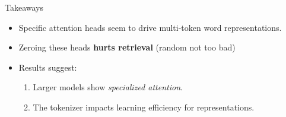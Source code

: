 \documentclass{beamer}
\begin{document}
\begin{frame}{Takeaways}
\begin{itemize}
\item Specific attention heads seem to drive multi-token word representations.
\item Zeroing these heads \textbf{hurts retrieval} (random not too bad)
\item Results suggest:
    \begin{enumerate}
        \item Larger models show \textit{specialized attention}.
        \item The tokenizer impacts learning efficiency for representations.
    \end{enumerate}
\end{itemize}
\end{frame}
\end{document}
